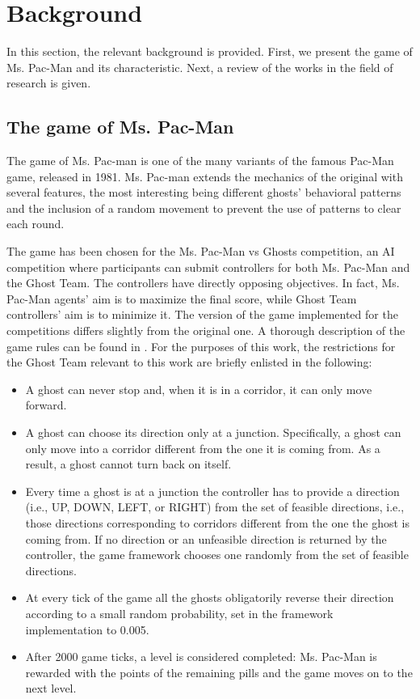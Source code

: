 \documentclass[journal]{IEEEtran}
\begin{document}
\section{Background}
\label{sec:Background}
In this section, the relevant background is provided. First, we present the game of Ms. Pac-Man and its characteristic. Next, a review of the works in the field of research is given.

\subsection{The game of Ms. Pac-Man}
\label{subsec:GameMsPacMan}
The game of Ms. Pac-man is one of the many variants of the famous
Pac-Man game, released in 1981. Ms. Pac-man  extends the mechanics of
the original with several features, the most interesting being
different ghosts' behavioral patterns and the inclusion of a random
movement to prevent the use of patterns to clear each round.

The game has been chosen for the Ms. Pac-Man vs Ghosts competition, an AI competition where participants can submit controllers for both Ms. Pac-Man and the Ghost Team. The controllers have directly opposing objectives. In fact, Ms. Pac-Man agents' aim is to maximize the final score, while Ghost Team controllers' aim is to minimize it. The version of the game implemented for the competitions differs slightly from the original one. A thorough description of the game rules can be found in \cite{MsPacManVSGhost2011}. For the purposes of this work, the restrictions for the Ghost Team relevant to this work are briefly enlisted in the following:
\begin{itemize}
  \item A ghost can never stop and, when it is in a corridor, it can only move forward.
  \item A ghost can choose its direction only at a junction. Specifically, a ghost can only move into a corridor different from the one it is coming from. As a result, a ghost cannot turn back on itself.
  \item Every time a ghost is at a junction the controller has to provide a direction (i.e., UP, DOWN, LEFT, or RIGHT) from the set of feasible directions, i.e., those directions corresponding to corridors different from the one the ghost is coming from. If no direction or an unfeasible direction is returned by the controller, the game framework chooses one randomly from the set of feasible directions.
  \item At every tick of the game all the ghosts obligatorily reverse their direction according to a small random probability, set in the framework implementation to 0.005.
  \item After 2000 game ticks, a level is considered completed: Ms. Pac-Man is rewarded with the points of the remaining pills and the game moves on to the next level.
\end{itemize}
\end{document}

